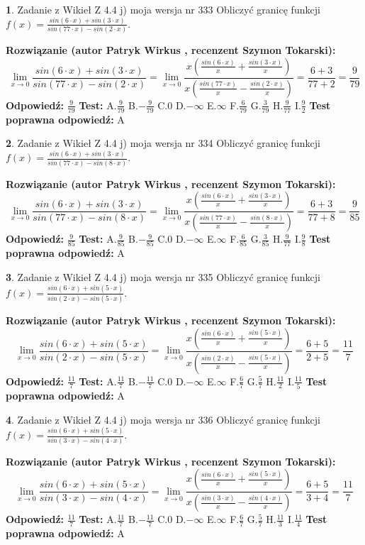 \documentclass[12pt, a4paper]{article}
\theoremstyle{definition} %
\newtheorem{zad}{}
\newcommand{\zadStart}[1]{\begin{zad}#1\newline}
\newcommand{\zadStop}{\end{zad}}
\newcommand{\rozwStart}[2]{\noindent \textbf{Rozwiązanie (autor #1 , recenzent #2): }\newline}
\newcommand{\rozwStop}{\newline}
\newcommand{\odpStart}{\noindent \textbf{Odpowiedź:}\newline}
\newcommand{\odpStop}{\newline}
\newcommand{\testStart}{\noindent \textbf{Test:}\newline}
\newcommand{\testStop}{\newline}
\newcommand{\kluczStart}{\noindent \textbf{Test poprawna odpowiedź:}\newline}
\newcommand{\kluczStop}{\newline}
\begin{document}
\zadStart{Zadanie z Wikieł Z 4.4 j) moja wersja nr 333}
Obliczyć granicę funkcji $f(x)=\frac{sin(6\cdot x) +sin(3\cdot x)}{sin(77\cdot x) -sin(2\cdot x)}$.
\zadStop
\rozwStart{Patryk Wirkus}{Szymon Tokarski}
$$\lim\limits_{x\to 0}\frac{sin(6\cdot x) +sin(3\cdot x)}{sin(77\cdot x) -sin(2\cdot x)}=\lim\limits_{x\to 0}\frac{x(\frac{sin(6\cdot x)}{x}+\frac{sin(3\cdot x)}{x})}{x(\frac{sin(77\cdot x)}{x}-\frac{sin(2\cdot x)}{x})}=\frac{6+3}{77+2} = \frac{9}{79}$$
\rozwStop
\odpStart
$\frac{9}{79}$
\odpStop
\testStart
A.$\frac{9}{79}$
B.$-\frac{9}{79}$
C.$0$
D.$-\infty$
E.$\infty$
F.$\frac{6}{79}$
G.$\frac{3}{79}$
H.$\frac{9}{77}$
I.$\frac{9}{2}$
\testStop
\kluczStart
A
\kluczStop



\zadStart{Zadanie z Wikieł Z 4.4 j) moja wersja nr 334}
Obliczyć granicę funkcji $f(x)=\frac{sin(6\cdot x) +sin(3\cdot x)}{sin(77\cdot x) -sin(8\cdot x)}$.
\zadStop
\rozwStart{Patryk Wirkus}{Szymon Tokarski}
$$\lim\limits_{x\to 0}\frac{sin(6\cdot x) +sin(3\cdot x)}{sin(77\cdot x) -sin(8\cdot x)}=\lim\limits_{x\to 0}\frac{x(\frac{sin(6\cdot x)}{x}+\frac{sin(3\cdot x)}{x})}{x(\frac{sin(77\cdot x)}{x}-\frac{sin(8\cdot x)}{x})}=\frac{6+3}{77+8} = \frac{9}{85}$$
\rozwStop
\odpStart
$\frac{9}{85}$
\odpStop
\testStart
A.$\frac{9}{85}$
B.$-\frac{9}{85}$
C.$0$
D.$-\infty$
E.$\infty$
F.$\frac{6}{85}$
G.$\frac{3}{85}$
H.$\frac{9}{77}$
I.$\frac{9}{8}$
\testStop
\kluczStart
A
\kluczStop



\zadStart{Zadanie z Wikieł Z 4.4 j) moja wersja nr 335}
Obliczyć granicę funkcji $f(x)=\frac{sin(6\cdot x) +sin(5\cdot x)}{sin(2\cdot x) -sin(5\cdot x)}$.
\zadStop
\rozwStart{Patryk Wirkus}{Szymon Tokarski}
$$\lim\limits_{x\to 0}\frac{sin(6\cdot x) +sin(5\cdot x)}{sin(2\cdot x) -sin(5\cdot x)}=\lim\limits_{x\to 0}\frac{x(\frac{sin(6\cdot x)}{x}+\frac{sin(5\cdot x)}{x})}{x(\frac{sin(2\cdot x)}{x}-\frac{sin(5\cdot x)}{x})}=\frac{6+5}{2+5} = \frac{11}{7}$$
\rozwStop
\odpStart
$\frac{11}{7}$
\odpStop
\testStart
A.$\frac{11}{7}$
B.$-\frac{11}{7}$
C.$0$
D.$-\infty$
E.$\infty$
F.$\frac{6}{7}$
G.$\frac{5}{7}$
H.$\frac{11}{2}$
I.$\frac{11}{5}$
\testStop
\kluczStart
A
\kluczStop



\zadStart{Zadanie z Wikieł Z 4.4 j) moja wersja nr 336}
Obliczyć granicę funkcji $f(x)=\frac{sin(6\cdot x) +sin(5\cdot x)}{sin(3\cdot x) -sin(4\cdot x)}$.
\zadStop
\rozwStart{Patryk Wirkus}{Szymon Tokarski}
$$\lim\limits_{x\to 0}\frac{sin(6\cdot x) +sin(5\cdot x)}{sin(3\cdot x) -sin(4\cdot x)}=\lim\limits_{x\to 0}\frac{x(\frac{sin(6\cdot x)}{x}+\frac{sin(5\cdot x)}{x})}{x(\frac{sin(3\cdot x)}{x}-\frac{sin(4\cdot x)}{x})}=\frac{6+5}{3+4} = \frac{11}{7}$$
\rozwStop
\odpStart
$\frac{11}{7}$
\odpStop
\testStart
A.$\frac{11}{7}$
B.$-\frac{11}{7}$
C.$0$
D.$-\infty$
E.$\infty$
F.$\frac{6}{7}$
G.$\frac{5}{7}$
H.$\frac{11}{3}$
I.$\frac{11}{4}$
\testStop
\kluczStart
A
\kluczStop
\end{document}
